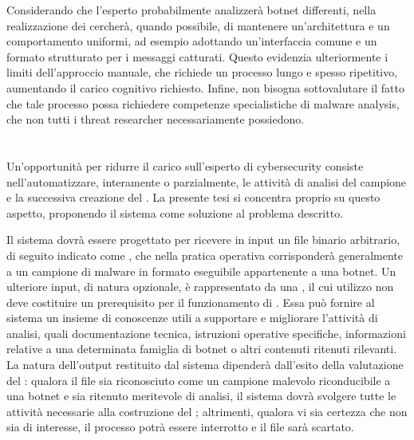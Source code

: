 Considerando che l'esperto probabilmente analizzerà botnet differenti, nella realizzazione dei \capture{} cercherà, quando possibile, di mantenere un'architettura e un comportamento uniformi, ad esempio adottando un'interfaccia comune e un formato strutturato per i messaggi catturati. Questo evidenzia ulteriormente i limiti dell'approccio manuale, che richiede un processo lungo e spesso ripetitivo, aumentando il carico cognitivo richiesto. Infine, non bisogna sottovalutare il fatto che tale processo possa richiedere competenze specialistiche di malware analysis, che non tutti i threat researcher necessariamente possiedono.

\section{\system{}} %

Un'opportunità per ridurre il carico sull'esperto di cybersecurity consiste nell'automatizzare, interamente o parzialmente, le attività di analisi del campione e la successiva creazione del \capture{}. La presente tesi si concentra proprio su questo aspetto, proponendo il sistema \system{} come soluzione al problema descritto.


Il sistema dovrà essere progettato per ricevere in input un file binario arbitrario, di seguito indicato come \binary{}, che nella pratica operativa corrisponderà generalmente a un campione di malware in formato eseguibile appartenente a una botnet. Un ulteriore input, di natura opzionale, è rappresentato da una \kb{}, il cui utilizzo non deve costituire un prerequisito per il funzionamento di \system{}. Essa può fornire al sistema un insieme di conoscenze utili a supportare e migliorare l'attività di analisi, quali documentazione tecnica, istruzioni operative specifiche, informazioni relative a una determinata famiglia di botnet o altri contenuti ritenuti rilevanti. La natura dell'output restituito dal sistema dipenderà dall'esito della valutazione del \binary{}: qualora il file sia riconosciuto come un campione malevolo riconducibile a una botnet e sia ritenuto meritevole di analisi, il sistema dovrà svolgere tutte le attività necessarie alla costruzione del \capture{}; altrimenti, qualora vi sia certezza che non sia di interesse, il processo potrà essere interrotto e il file sarà scartato. %

